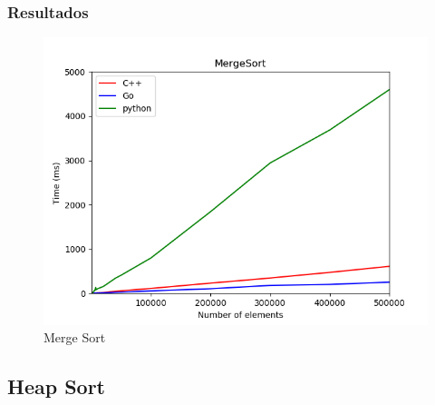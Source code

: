 \documentclass[
	11pt, %
]{beamer}
\begin{document}
\begin{frame}
	\frametitle{Resultados}
	
	\begin{figure}
		\includegraphics[width=0.8\linewidth]{mergeSort_1.png}
		\caption{Merge Sort}
	\end{figure}
\end{frame}

\subsection{Heap Sort}
\end{document}
